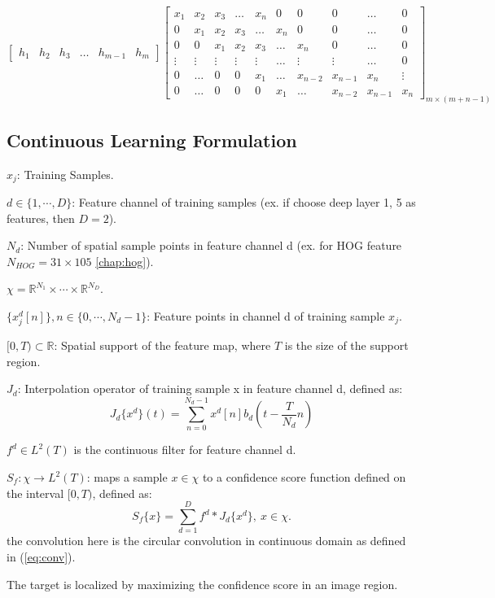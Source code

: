 \documentclass[12pt]{article}
\numberwithin{equation}{section}
\begin{document}
\begin{equation}
            \begin{bmatrix}
                h_1 & h_2 & h_3 & \ldots & h_{m-1} & h_m
            \end{bmatrix}
            \begin{bmatrix}
                x_1 & x_2 & x_3 & \ldots & x_n & 0 & 0 & 0& \ldots & 0 \\
                0 & x_1 & x_2 & x_3 & \ldots & x_n & 0 & 0 & \ldots & 0 \\
                0 & 0 & x_1 & x_2 & x_3 & \ldots & x_n & 0  & \ldots & 0 \\
                \vdots & \vdots & \vdots & \vdots & \vdots & \ldots & \vdots & \vdots  & \ldots & 0 \\
                0 & \ldots & 0 & 0 & x_1 & \ldots & x_{n-2} & x_{n-1} & x_n & \vdots \\
                0 & \ldots & 0 & 0 & 0 & x_1 & \ldots & x_{n-2} & x_{n-1} & x_n
            \end{bmatrix}_{m \times (m+n-1)}
\end{equation}
\subsection{Continuous Learning Formulation}
$x_j$: Training Samples. \par
$d \in \{1, \cdots , D\}$: Feature channel of training samples (ex. if choose deep layer 1, 5 as features, then $D = 2$). \par
$N_d$: Number of spatial sample points in feature channel d (ex. for HOG feature $N_{HOG}=31 \times 105$ \autoref{chap:hog}). \par
$\chi=\mathbb{R}^{N_1} \times \cdots \times \mathbb{R}^{N_D}$. \par
$\{x^d_j[n]\}, n \in \{0, \cdots, N_d -1\}$: Feature points in channel d of training sample $x_j$.\par
$[0, T) \subset \mathbb{R} $: Spatial support of the feature map, where $T$ is the size of the support region.\par
$J_d$: Interpolation operator of training sample x in feature channel d, defined as: 
\begin{equation}
	J_d\{x^d\}(t)=\sum^{N_d-1}_{n=0} x^d[n] b_d(t-\frac{T}{N_d} n)
\end{equation} \par
$f^d \in L^2(T)$ is the continuous filter for feature channel d. \par
$S_f: \chi \rightarrow L^2(T)$: maps a sample $x \in \chi$ to a confidence score function defined on the interval $[0, T)$, defined as: 
\begin{equation} \label{eq:score}
	S_f\{x\}=\sum^D_{d=1} f^d * J_d\{x^d\}, \  x \in \chi.
\end{equation} 
the convolution here is the circular convolution in continuous domain as defined in (\ref{eq:conv}). \par
The target is localized by maximizing the confidence score in an image region. \par
\end{document}

